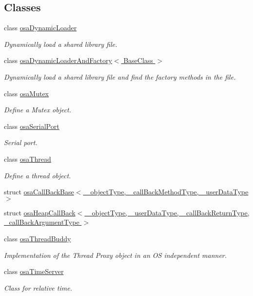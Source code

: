 \subsection*{Classes}
\begin{DoxyCompactItemize}
\item 
class \hyperlink{classosa_dynamic_loader}{osa\+Dynamic\+Loader}
\begin{DoxyCompactList}\small\item\em Dynamically load a shared library file. \end{DoxyCompactList}\item 
class \hyperlink{classosa_dynamic_loader_and_factory}{osa\+Dynamic\+Loader\+And\+Factory$<$ Base\+Class $>$}
\begin{DoxyCompactList}\small\item\em Dynamically load a shared library file and find the factory methods in the file. \end{DoxyCompactList}\item 
class \hyperlink{classosa_mutex}{osa\+Mutex}
\begin{DoxyCompactList}\small\item\em Define a Mutex object. \end{DoxyCompactList}\item 
class \hyperlink{classosa_serial_port}{osa\+Serial\+Port}
\begin{DoxyCompactList}\small\item\em Serial port. \end{DoxyCompactList}\item 
class \hyperlink{classosa_thread}{osa\+Thread}
\begin{DoxyCompactList}\small\item\em Define a thread object. \end{DoxyCompactList}\item 
struct \hyperlink{structosa_call_back_base}{osa\+Call\+Back\+Base$<$ \+\_\+object\+Type, \+\_\+call\+Back\+Method\+Type, \+\_\+user\+Data\+Type $>$}
\item 
struct \hyperlink{structosa_heap_call_back}{osa\+Heap\+Call\+Back$<$ \+\_\+object\+Type, \+\_\+user\+Data\+Type, \+\_\+call\+Back\+Return\+Type, \+\_\+call\+Back\+Argument\+Type $>$}
\item 
class \hyperlink{classosa_thread_buddy}{osa\+Thread\+Buddy}
\begin{DoxyCompactList}\small\item\em Implementation of the Thread Proxy object in an O\+S independent manner. \end{DoxyCompactList}\item 
class \hyperlink{classosa_time_server}{osa\+Time\+Server}
\begin{DoxyCompactList}\small\item\em Class for relative time. \end{DoxyCompactList}\end{DoxyCompactItemize}

